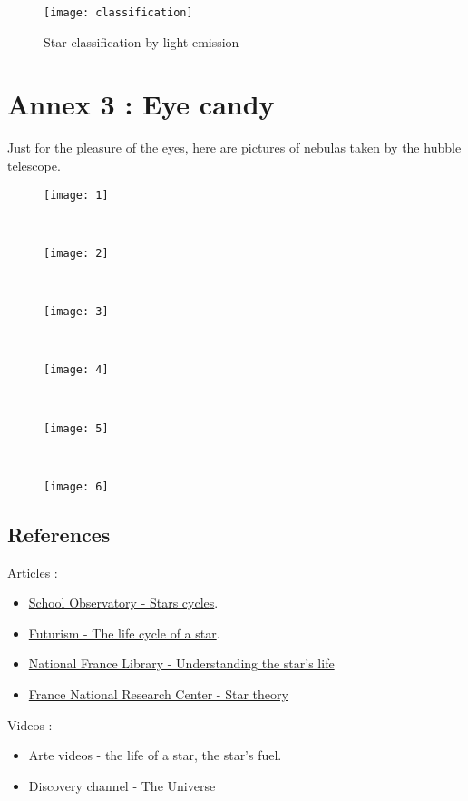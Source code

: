 \documentclass[a4paper, 11pt]{article} %
\begin{document}
\begin{figure}[h]
\centering
\texttt{[image: classification]}
\caption{Star classification by light emission}
\end{figure}

\newpage

\section*{Annex 3 : Eye candy}
Just for the pleasure of the eyes, here are pictures of nebulas taken by the hubble telescope.

\begin{figure*}[h!]
    \centering
  \begin{subfigure}[b]{0.45\textwidth}
      \texttt{[image: 1]}
  \end{subfigure}%
  ~ 
  \begin{subfigure}[b]{0.45\textwidth}
      \centering
      \texttt{[image: 2]}
  \end{subfigure}
 ~
  \begin{subfigure}[b]{0.45\textwidth}
      \centering
      \texttt{[image: 3]}
  \end{subfigure}
  ~ 
  \begin{subfigure}[b]{0.45\textwidth}
      \centering
      \texttt{[image: 4]}
  \end{subfigure}
  ~
  \begin{subfigure}[b]{0.45\textwidth}
      \centering
      \texttt{[image: 5]}
  \end{subfigure}
  ~ 
  \begin{subfigure}[b]{0.45\textwidth}
      \centering
      \texttt{[image: 6]}
  \end{subfigure}
  
\end{figure*}

\newpage

\subsection*{References}
Articles :
\begin{itemize}
\item \href{http://www.schoolsobservatory.org.uk/learn/astro/stars/cycle}{School Observatory - Stars cycles}.
\item \href{https://futurism.com/the-life-cycle-of-a-star/}{Futurism - The life cycle of a star}.
\item \href{http://expositions.bnf.fr/ciel/elf/page12.htm}{National France Library - Understanding the star's life}
\item \href{http://www.cnrs.fr/cw/dossiers/dosbig/decouv/xchrono/etoiles/niv1_1.htm}{France National Research Center - Star theory}
\end{itemize}

Videos :
\begin{itemize}
\item Arte videos - the life of a star, the star's fuel.
\item Discovery channel - The Universe
\end{itemize}

%

%

\end{document}
